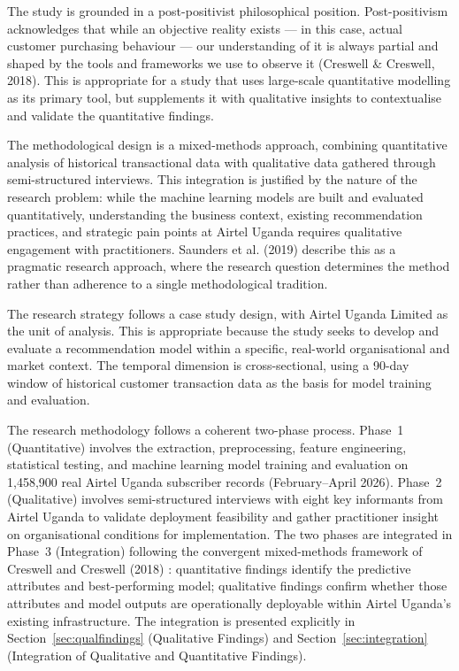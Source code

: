 The study is grounded in a post-positivist philosophical position. Post-positivism acknowledges that while an objective reality exists --- in this case, actual customer purchasing behaviour --- our understanding of it is always partial and shaped by the tools and frameworks we use to observe it (Creswell \& Creswell, 2018). This is appropriate for a study that uses large-scale quantitative modelling as its primary tool, but supplements it with qualitative insights to contextualise and validate the quantitative findings.

The methodological design is a mixed-methods approach, combining quantitative analysis of historical transactional data with qualitative data gathered through semi-structured interviews. This integration is justified by the nature of the research problem: while the machine learning models are built and evaluated quantitatively, understanding the business context, existing recommendation practices, and strategic pain points at Airtel Uganda requires qualitative engagement with practitioners. Saunders et al. (2019) describe this as a pragmatic research approach, where the research question determines the method rather than adherence to a single methodological tradition.

The research strategy follows a case study design, with Airtel Uganda Limited as the unit of analysis. This is appropriate because the study seeks to develop and evaluate a recommendation model within a specific, real-world organisational and market context. The temporal dimension is cross-sectional, using a 90-day window of historical customer transaction data as the basis for model training and evaluation.

The research methodology follows a coherent two-phase process. Phase~1
(Quantitative) involves the extraction, preprocessing, feature engineering,
statistical testing, and machine learning model training and evaluation on
1,458,900 real Airtel Uganda subscriber records (February--April 2026). Phase~2
(Qualitative) involves semi-structured interviews with eight key informants from
Airtel Uganda to validate deployment feasibility and gather practitioner insight
on organisational conditions for implementation. The two phases are integrated in
Phase~3 (Integration) following the convergent mixed-methods framework of Creswell
and Creswell (2018) \cite{ref17}: quantitative findings identify the predictive
attributes and best-performing model; qualitative findings confirm whether those
attributes and model outputs are operationally deployable within Airtel Uganda's
existing infrastructure. The integration is presented explicitly in
Section~\ref{sec:qualfindings} (Qualitative Findings) and
Section~\ref{sec:integration} (Integration of Qualitative and Quantitative
Findings).


